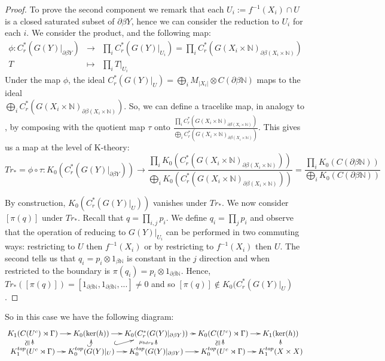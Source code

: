 \begin{example}
\begin{proof}
To prove the second component we remark that each $U_{i}:=f^{-1}(X_{i}) \cap U$ is a closed saturated subset of $\partial\beta Y$, hence we can consider the reduction to $U_{i}$ for each $i$. We consider the product, and the following map:
\begin{eqnarray*}
\phi : C^{*}_{r}(G(Y)|_{\partial\beta Y})& \rightarrow & \prod_{i} C^{*}_{r}(G(Y)|_{U_{i}})= \prod_{i}C^{*}_{r}(G(X_{i} \times \mathbb{N})_{\partial\beta(X_{i}\times \mathbb{N})})\\
 T  &\mapsto & \prod_{i}T|_{U_{i}}
\end{eqnarray*}
Under the map $\phi$, the ideal $C^{*}_{r}(G(Y)|_{U})= \bigoplus_{i}M_{\vert X_{i}\vert} \otimes C(\partial\beta \mathbb{N})$ maps to the ideal \\$\bigoplus_{i}C^{*}_{r}(G(X_{i} \times \mathbb{N})_{\partial\beta(X_{i}\times \mathbb{N})})$. So, we can define a tracelike map, in analogy to \cite[Section 6]{explg1}, by composing with the quotient map $\tau$ onto $\frac{\prod_{i}C^{*}_{r}(G(X_{i} \times \mathbb{N})_{\partial\beta(X_{i}\times \mathbb{N})})}{\bigoplus_{i}C^{*}_{r}(G(X_{i} \times \mathbb{N})_{\partial\beta(X_{i}\times \mathbb{N})})}$. This gives us a map at the level of K-theory:
\begin{equation*}
Tr_{*}=\phi \circ \tau : K_{0}(C^{*}_{r}(G(Y)|_{\partial\beta Y})) \rightarrow \frac{\prod_{i}K_{0}(C^{*}_{r}(G(X_{i} \times \mathbb{N})_{\partial\beta(X_{i}\times \mathbb{N})}))}{\bigoplus_{i}K_{0}(C^{*}_{r}(G(X_{i} \times \mathbb{N})_{\partial\beta(X_{i}\times \mathbb{N})}))}= \frac{\prod_{i}K_{0}(C(\partial\beta \mathbb{N}))}{\bigoplus_{i}K_{0}(C(\partial\beta \mathbb{N}))}
\end{equation*}

By construction, $K_{0}(C^{*}_{r}(G(Y)|_{U}))$ vanishes under $Tr_{*}$. We now consider $[\pi(q)]$ under $Tr_{*}$. Recall that $q=\prod_{i,j}p_{i}$. We define $q_{i}=\prod_{j}p_{i}$ and observe that the operation of reducing to $G(Y)|_{U_{i}}$ can be performed in two commuting ways: restricting to $U$ then $f^{-1}(X_{i})$ or by restricting to $f^{-1}(X_{i})$ then $U$. The second tells us that $q_{i}=p_{i} \otimes 1_{\beta\mathbb{N}}$ is constant in the $j$ direction and when restricted to the boundary is $\pi(q_{i})=p_{i}\otimes 1_{\partial\beta \mathbb{N}}$. Hence, $Tr_{*}([\pi(q)])=[1_{\partial\beta \mathbb{N}},1_{\partial\beta\mathbb{N}},...] \not = 0$ and so $[\pi(q)] \not \in K_{0}(C^{*}_{r}(G(Y)|_{U})$.
\end{proof}

So in this case we have the following diagram:
\begin{equation*}
\xymatrix@=0.7em{
 K_{1}(C(U^{c})\rtimes \Gamma) \ar[r] & K_{0}(\ker (h)) \ar[r]& K_{0}(C^{*}_{r}(G(Y)|_{\partial\beta Y})) \ar[r]& K_{0}(C(U^{c})\rtimes \Gamma)\ar[r] & K_{1}(\ker (h))  \\
 K_{1}^{top}(U^{c}\rtimes \Gamma) \ar[r] \ar[u]^{\ucong}& K_{0}^{top}(G(Y)|_{U}) \ar[r]\ar@{^{(}->}[u]\ar@{^{(}->}[ru]& K_{0}^{top}(G(Y)|_{\partial\beta Y}) \ar[r]\ar[u]^{\mu_{bdry}}& K_{0}^{top}(U^{c}\rtimes \Gamma) \ar[r]\ar[u]^{\ucong}& K_{1}^{top}(X \times X)\ar[u]
}
\end{equation*}


\end{example}
